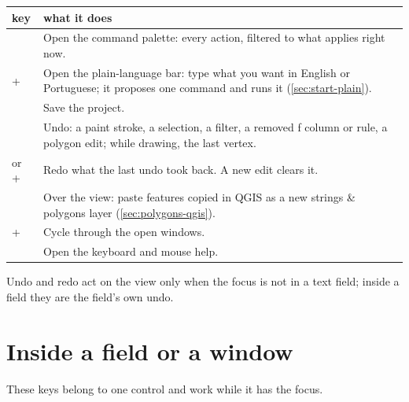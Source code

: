 \begin{tabularx}{\linewidth}{@{}p{36mm}L@{}}
\toprule
key & what it does \\
\midrule
{} & Open the command palette: every action, filtered to what applies right now. \\
+ & Open the plain-language bar: type what you want in English or Portuguese; it proposes one command and  runs it (\cref{sec:start-plain}). \\
 & Save the project. \\
 & Undo: a paint stroke, a selection, a filter, a removed ƒ column or rule, a polygon edit;
  while drawing, the last vertex. \\
 or + & Redo what the last undo took back. A new edit clears it. \\
 & Over the view: paste features copied in QGIS as a new strings \& polygons layer
  (\cref{sec:polygons-qgis}). \\
+\key{\textasciigrave} & Cycle through the open windows. \\
 & Open the keyboard and mouse help. \\
\bottomrule
\end{tabularx}

Undo and redo act on the view only when the focus is not in a text field; inside a field they are
the field's own undo.

\section{Inside a field or a window}\label{sec:keys-fields}

These keys belong to one control and work while it has the focus.

